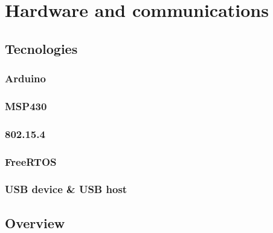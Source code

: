 \chapter{Hardware and communications}
\label{ch:hardware}
	
	\section{Tecnologies}
		\subsection{Arduino}
		\subsection{MSP430}
		\subsection{802.15.4}
		\subsection{FreeRTOS}
		\subsection{USB device \& USB host}

	\section{Overview}




